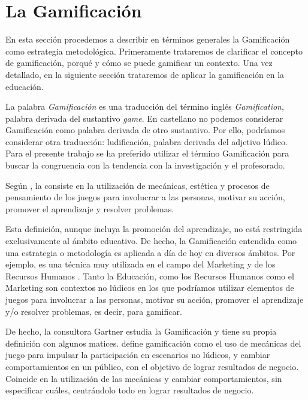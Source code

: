 
\section{La Gamificación}




En esta sección procedemos a describir en términos generales la Gamificación como estrategia metodológica.
%
Primeramente trataremos de clarificar el concepto de gamificación, porqué y cómo se puede gamificar un contexto.
%
Una vez detallado, en la siguiente sección trataremos de aplicar la gamificación en la educación.


La palabra \textit{Gamificación} es una traducción del término inglés \textit{Gamification}, palabra derivada del sustantivo \textit{game}.
%
En castellano no podemos considerar Gamificación como palabra derivada de otro sustantivo. Por ello, podríamos considerar otra traducción: ludificación, palabra derivada del adjetivo lúdico.
%
Para el presente trabajo se ha preferido utilizar el término Gamificación para buscar la congruencia con la tendencia con la investigación y el profesorado.



Según  \cite{GamificationDef}, la  consiste en la utilización de mecánicas, estética y procesos de pensamiento de los juegos para involucrar a las personas, motivar su acción, promover el aprendizaje y resolver problemas.

Esta definición, aunque incluya la promoción del aprendizaje, no está restringida exclusivamente al ámbito educativo. 
%
De hecho, la Gamificación entendida como una estrategia o metodología es aplicada a día de hoy en diversos ámbitos. 
%
Por ejemplo, es una técnica muy utilizada en el campo del Marketing  \cite{GamifyMark} y de los Recursos Humanos  \cite{GamifyHR}.
%
Tanto la Educación, como los Recursos Humanos como el Marketing son contextos no lúdicos en los que podríamos utilizar elementos de juegos para involucrar a las personas, motivar su acción, promover el aprendizaje y/o resolver problemas, es decir, para gamificar.

De hecho, la consultora Gartner estudia la Gamificación y tiene su propia definición con algunos matices.
%
 \cite{Gartner} define gamificación como el uso de mecánicas del juego para impulsar la participación en escenarios no lúdicos, y cambiar comportamientos en un público, con el objetivo de lograr resultados de negocio.
%
Coincide en la utilización de las mecánicas y cambiar comportamientos, sin especificar cuáles, centrándolo todo en lograr resultados de negocio.

